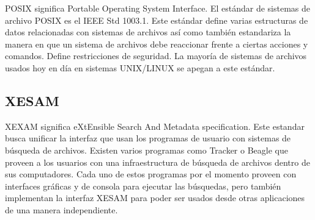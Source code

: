 POSIX significa Portable Operating System Interface. El estándar de sistemas de archivo POSIX es el IEEE Std 1003.1. Este estándar define varias estructuras de datos relacionadas con sistemas de archivos así como también estandariza la manera en que un sistema de archivos debe reaccionar frente a ciertas acciones y comandos. Define restricciones de seguridad. La mayoría de sistemas de archivos usados hoy en día en sistemas UNIX/LINUX se apegan a este estándar.

\subsection{XESAM}

XEXAM significa eXtEnsible Search And Metadata specification. Este estandar busca unificar la interfaz que usan los programas de usuario con sistemas de búsqueda de archivos. Existen varios programas como Tracker o Beagle que proveen a los usuarios con una infraestructura de búsqueda de archivos dentro de sus computadores. Cada uno de estos programas por el momento proveen con interfaces gráficas y de consola para ejecutar las búsquedas, pero también implementan la interfaz XESAM para poder ser usados desde otras aplicaciones de una manera independiente.



